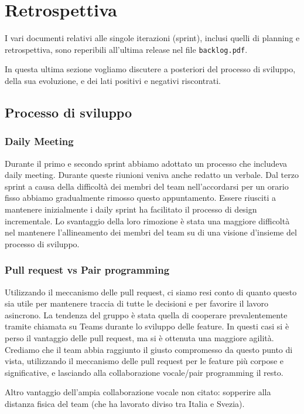 \newpage
\section{Retrospettiva}
I vari documenti relativi alle singole iterazioni (sprint), inclusi quelli di planning e retrospettiva, sono reperibili all'ultima release nel file \texttt{backlog.pdf}.


In questa ultima sezione vogliamo discutere a posteriori del processo di sviluppo, della sua evoluzione, e dei lati positivi e negativi riscontrati.

\subsection{Processo di sviluppo}
\subsubsection{Daily Meeting}
Durante il primo e secondo sprint abbiamo adottato un processo che includeva daily meeting. Durante queste riunioni veniva anche redatto un verbale. Dal terzo sprint a causa della difficoltà dei membri del team nell'accordarsi per un orario fisso abbiamo gradualmente rimosso questo appuntamento. Essere riusciti a mantenere inizialmente i daily sprint ha facilitato il processo di design incrementale. Lo svantaggio della loro rimozione è stata una maggiore difficoltà nel mantenere l'allineamento dei membri del team su di una visione d'insieme del processo di sviluppo.

\subsubsection{Pull request vs Pair programming}
Utilizzando il meccanismo delle pull request, ci siamo resi conto di quanto questo sia utile per mantenere traccia di tutte le decisioni e per favorire il lavoro asincrono.
La tendenza del gruppo è stata quella di cooperare prevalentemente tramite chiamata su Teams durante lo sviluppo delle feature. In questi casi si è perso il vantaggio delle pull request, ma si è ottenuta una maggiore agilità.
Crediamo che il team abbia raggiunto il giusto compromesso da questo punto di vista, utilizzando il meccanismo delle pull request per le feature più corpose e significative, e lasciando alla collaborazione vocale/pair programming il resto.

Altro vantaggio dell'ampia collaborazione vocale non citato: sopperire alla distanza fisica del team (che ha lavorato diviso tra Italia e Svezia).

